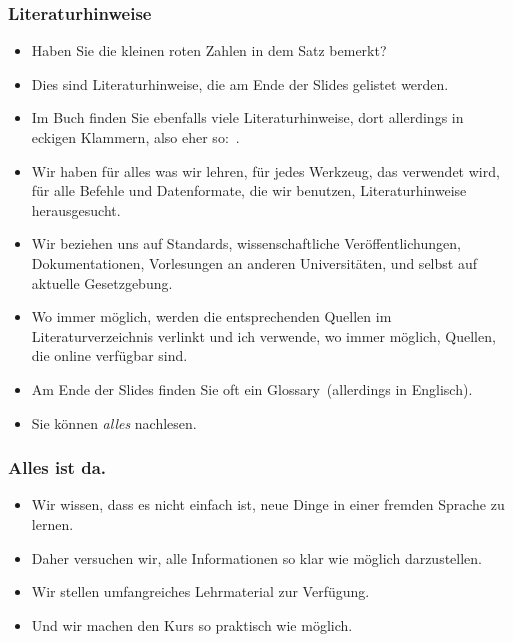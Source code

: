 \documentclass[aspectratio=169,mathserif,notheorems]{beamer}%
\begin{document}
\begin{frame}%
\frametitle{Literaturhinweise}%
\begin{itemize}%
\item Haben Sie die kleinen roten Zahlen in dem Satz \emph{} bemerkt?%
\item<2-> Dies sind Literaturhinweise, die am Ende der Slides gelistet werden.%
\item<3-> Im Buch \cite{programmingWithPython} finden Sie ebenfalls viele Literaturhinweise, dort allerdings in eckigen Klammern, also eher so:~.%
\item<4-> Wir haben für alles was wir lehren, für jedes Werkzeug, das verwendet wird, für alle Befehle und Datenformate, die wir benutzen, Literaturhinweise herausgesucht.%
\item<5-> Wir beziehen uns auf Standards, wissenschaftliche Veröffentlichungen, Dokumentationen, Vorlesungen an anderen Universitäten, und selbst auf aktuelle Gesetzgebung.%
\item<6-> Wo immer möglich, werden die entsprechenden Quellen im Literaturverzeichnis verlinkt und ich verwende, wo immer möglich, Quellen, die online verfügbar sind.%
\item<7-> Am Ende der Slides finden Sie oft ein Glossary~(allerdings in Englisch).%
\item<8-> Sie können \emph{alles} nachlesen.%
\end{itemize}%
\end{frame}%
%
\begin{frame}%
\frametitle{Alles ist da.}%
\begin{itemize}%
\item Wir wissen, dass es nicht einfach ist, neue Dinge in einer fremden Sprache zu lernen.%
\item<2-> Daher versuchen wir, alle Informationen so klar wie möglich darzustellen.%
\item<3-> Wir stellen umfangreiches Lehrmaterial zur Verfügung.%
\item<4-> Und wir machen den Kurs so praktisch wie möglich.%
\end{itemize}%
\end{frame}%
%
\end{document}
